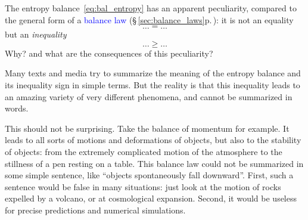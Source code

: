 \documentclass[a4paper,12pt,%
onecolumn,oneside,%
british%
]{memoir}
\renewcommand*{\|}[1][]{\nonscript\:#1\vert\nonscript\:\mathopen{}}
\newcommand*{\sect}{\S}%
\renewcommand*{\autoref}[3][\sect\,\ref]{\textcolor{blue}{#3} {\color{blue}\scriptsize(\faIcon[regular]{eye}\;#1{#2}\;p.\,\pageref{#2})}}
\begin{document}

The entropy balance~\eqref{eq:bal_entropy} has an apparent peculiarity, compared to the general form of a \autoref{sec:balance_laws}{balance law}: it is not an equality
$$\dotso=\dotso$$
but an \emph{inequality}
$$\dotso\ge\dotso$$
Why? and what are the consequences of this peculiarity?

\medskip

Many texts and media try to summarize the meaning of the entropy balance and its inequality sign in simple terms. But the reality is that this inequality leads to an amazing variety of very different phenomena, and cannot be summarized in words.

This should not be surprising. Take the %
balance of momentum for example. It leads to all sorts of motions and deformations of objects, but also to the stability of objects: from the extremely complicated motion of the atmosphere to the stillness of a pen resting on a table. This balance law could not be summarized in some simple sentence, like \enquote{objects spontaneously fall downward}. First, such a sentence would be false in many situations: just look at the motion of rocks expelled by a volcano, or at cosmological expansion. Second, it would be useless for precise predictions and numerical simulations.
\end{document}
